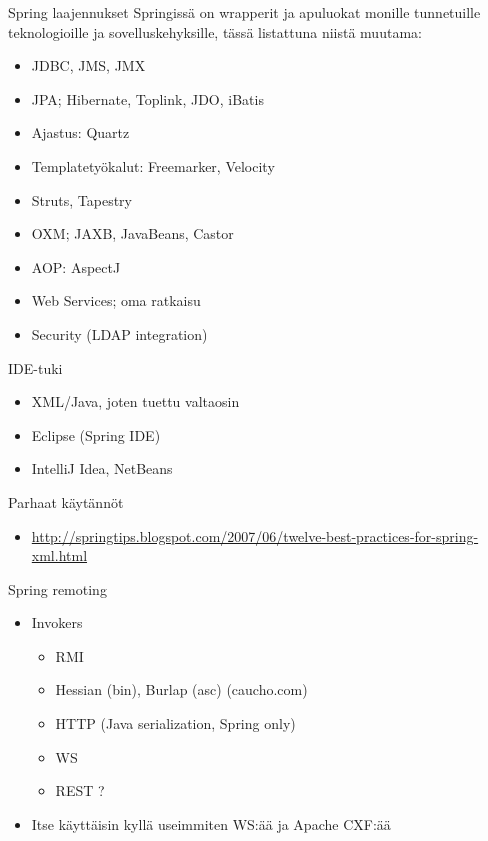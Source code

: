 \documentclass[hyperref={pdfauthor=\AUTHOR},14pt]{beamer}
\begin{document}
\begin{frame}{Spring laajennukset}
Springissä on wrapperit ja apuluokat monille tunnetuille
teknologioille ja sovelluskehyksille, tässä listattuna niistä muutama:
\begin{itemize}
\item JDBC, JMS, JMX
\item JPA; Hibernate, Toplink, JDO, iBatis
\item Ajastus: Quartz
\item Templatetyökalut: Freemarker, Velocity
\item Struts, Tapestry
\item OXM; JAXB, JavaBeans, Castor 
\item AOP: AspectJ
\item Web Services; oma ratkaisu
\item Security (LDAP integration)
\end{itemize}
\end{frame}

\begin{frame}{IDE-tuki}
\begin{itemize}
\item XML/Java, joten tuettu valtaosin
\item Eclipse (Spring IDE)
\item IntelliJ Idea, NetBeans
\end{itemize}
\end{frame}

\begin{frame}{Parhaat käytännöt}
\begin{itemize}
\item \url{http://springtips.blogspot.com/2007/06/twelve-best-practices-for-spring-xml.html}
\end{itemize}
\end{frame}

\begin{frame}{Spring remoting}
\begin{itemize}
\item Invokers
\begin{itemize}
\item RMI
\item Hessian (bin), Burlap (asc) (caucho.com)
\item HTTP (Java serialization, Spring only)
\item WS
\item REST ?
\end{itemize}
\item Itse käyttäisin kyllä useimmiten WS:ää ja Apache CXF:ää
\end{itemize}
\end{frame}

\end{document}
